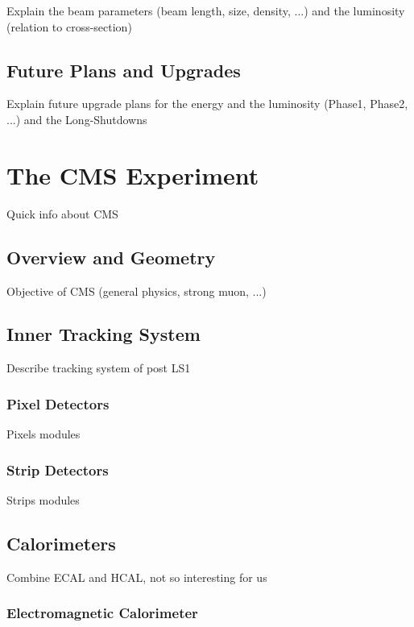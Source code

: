             Explain the beam parameters (beam length, size, density, ...) and the luminosity (relation to cross-section)

        \subsection{Future Plans and Upgrades}

            Explain future upgrade plans for the energy and the luminosity (Phase1, Phase2, ...) and the Long-Shutdowns

    \section{The CMS Experiment}

        Quick info about CMS

        \subsection{Overview and Geometry}

            Objective of CMS (general physics, strong muon, ...)

        \subsection{Inner Tracking System}

            Describe tracking system of post LS1

            \subsubsection{Pixel Detectors}

                Pixels modules

            \subsubsection{Strip Detectors}

                Strips modules

        \subsection{Calorimeters}

            Combine ECAL and HCAL, not so interesting for us

            \subsubsection{Electromagnetic Calorimeter}

